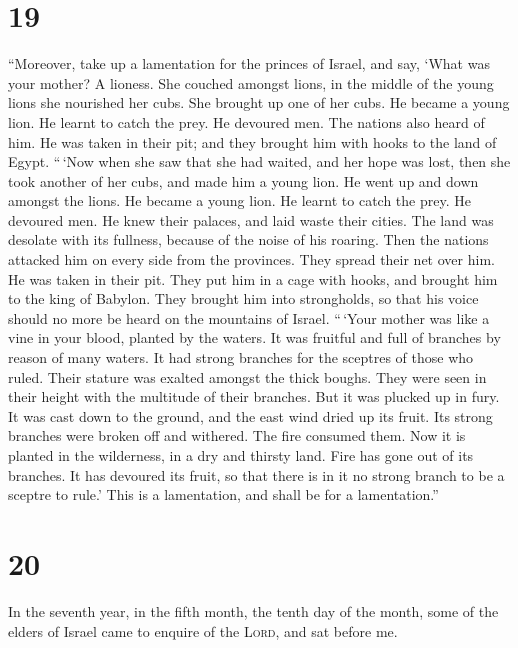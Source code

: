 \hypertarget{section-18}{%
\section{19}\label{section-18}}

 ``Moreover, take up a lamentation for the princes of
Israel,  and say, `What was your mother? A lioness. She
couched amongst lions, in the middle of the young lions she nourished
her cubs.  She brought up one of her cubs. He became a
young lion. He learnt to catch the prey. He devoured men. 
The nations also heard of him. He was taken in their pit; and they
brought him with hooks to the land of Egypt.  ``\,`Now
when she saw that she had waited, and her hope was lost, then she took
another of her cubs, and made him a young lion.  He went
up and down amongst the lions. He became a young lion. He learnt to
catch the prey. He devoured men.  He knew their palaces,
and laid waste their cities. The land was desolate with its fullness,
because of the noise of his roaring.  Then the nations
attacked him on every side from the provinces. They spread their net
over him. He was taken in their pit.  They put him in a
cage with hooks, and brought him to the king of Babylon. They brought
him into strongholds, so that his voice should no more be heard on the
mountains of Israel.  ``\,`Your mother was like a vine in
your blood, planted by the waters. It was fruitful and full of branches
by reason of many waters.  It had strong branches for the
sceptres of those who ruled. Their stature was exalted amongst the thick
boughs. They were seen in their height with the multitude of their
branches.  But it was plucked up in fury. It was cast
down to the ground, and the east wind dried up its fruit. Its strong
branches were broken off and withered. The fire consumed them.
 Now it is planted in the wilderness, in a dry and
thirsty land.  Fire has gone out of its branches. It has
devoured its fruit, so that there is in it no strong branch to be a
sceptre to rule.' This is a lamentation, and shall be for a
lamentation.''

\hypertarget{section-19}{%
\section{20}\label{section-19}}

 In the seventh year, in the fifth month, the tenth day of
the month, some of the elders of Israel came to enquire of the
\textsc{Lord}, and sat before me.


